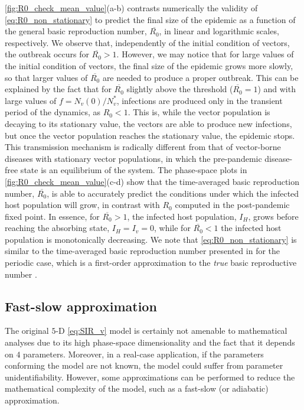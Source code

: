 \cref{fig:R0_check_mean_value}(a-b) contrasts numerically the validity of
\cref{eq:R0_non_stationary} to predict the final size of the epidemic as a
function of the general basic reproduction number, $\overline{R_0}$, in linear
and logarithmic scales, respectively. We observe that, independently of the
initial condition of vectors, the outbreak occurs for $\overline{R_0}>1$.
However, we may notice that for large values of the initial condition of
vectors, the final size of the epidemic grows more slowly, so that larger
values of $\overline{R_0}$ are needed to produce a proper outbreak. This can be
explained by the fact that for $\overline{R_0}$ slightly above the threshold
($\overline{R_0}=1$) and with large values of $f=N_v(0)/N_v^*$, infections are
produced only in the transient period of the dynamics, as $R_0<1$. This is,
while the vector population is decaying to its stationary value, the vectors
are able to produce new infections, but once the vector population reaches the
stationary value, the epidemic stops. This transmission mechanism is radically
different from that of vector-borne diseases with stationary vector
populations, in which the pre-pandemic disease-free state is an equilibrium of
the system. The phase-space plots in \cref{fig:R0_check_mean_value}(c-d) show
that the time-averaged basic reproduction number, $\overline{R_0}$, is able to
accurately predict the conditions under which the infected host population will
grow, in contrast with $R_0$ computed in the post-pandemic fixed point. In
essence, for $\overline{R_0}>1$, the infected host population, $I_H$, grows
before reaching the absorbing state, $I_H=I_v=0$, while for $\overline{R_0}<1$
the infected host population is monotonically decreasing. We note that
\cref{eq:R0_non_stationary} is similar to the time-averaged basic reproduction
number presented in \cite{Wesley2009} for the periodic case, which is a
first-order approximation to the \textit{true} basic reproductive number
\cite{Bacaer2006}.

\subsection{Fast-slow approximation}

The original $5$-D \cref{eq:SIR_v} model is certainly not amenable to
mathematical analyses due to its high phase-space dimensionality and the fact
that it depends on $4$ parameters. Moreover, in a real-case application, if the
parameters conforming the model are not known, the model could suffer from
parameter unidentifiability. However, some approximations can be performed to
reduce the mathematical complexity of the model, such as a fast-slow (or
adiabatic) approximation.


